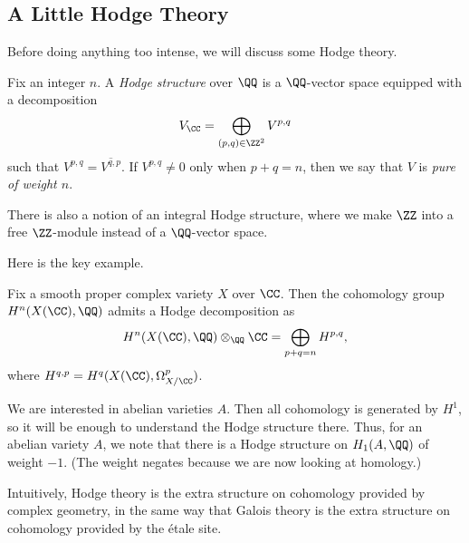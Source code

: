 \documentclass{article}
\begin{document}
\subsection{A Little Hodge Theory}
Before doing anything too intense, we will discuss some Hodge theory.
\begin{definition}
	Fix an integer $n$. A \textit{Hodge structure} over $\QQ$ is a $\QQ$-vector space equipped with a decomposition
	\[V_\CC=\bigoplus_{(p,q)\in\ZZ^2}V^{p,q}\]
	such that $V^{p,q}=\overline{V^{q,p}}$. If $V^{p,q}\ne0$ only when $p+q=n$, then we say that $V$ is \textit{pure of weight $n$}.
\end{definition}
\begin{remark}
	There is also a notion of an integral Hodge structure, where we make $\ZZ$ into a free $\ZZ$-module instead of a $\QQ$-vector space.
\end{remark}
Here is the key example.
\begin{example}
	Fix a smooth proper complex variety $X$ over $\CC$. Then the cohomology group $H^n(X(\CC),\QQ)$ admits a Hodge decomposition as
	\[H^n(X(\CC),\QQ)\otimes_\QQ\CC=\bigoplus_{p+q=n}H^{p,q},\]
	where $H^{q,p}=H^q(X(\CC),\Omega_{X/\CC}^p)$.
\end{example}
\begin{example}
	We are interested in abelian varieties $A$. Then all cohomology is generated by $H^1$, so it will be enough to understand the Hodge structure there. Thus, for an abelian variety $A$, we note that there is a Hodge structure on $H_1(A,\QQ)$ of weight $-1$. (The weight negates because we are now looking at homology.)
\end{example}
Intuitively, Hodge theory is the extra structure on cohomology provided by complex geometry, in the same way that Galois theory is the extra structure on cohomology provided by the \'etale site.
\end{document}
